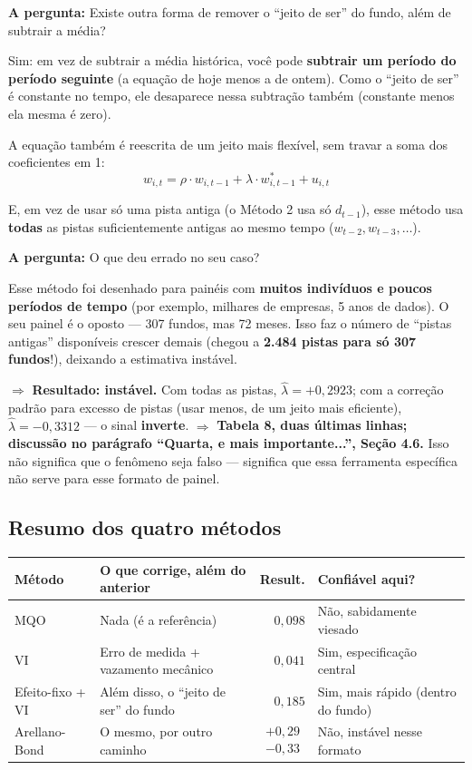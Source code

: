 \documentclass[11pt,a4paper]{article}
\newcommand{\pergunta}[1]{\par\vspace{4pt}\noindent\textbf{\color{azul}A pergunta:} #1\par\vspace{2pt}}
\begin{document}
\pergunta{Existe outra forma de remover o ``jeito de ser'' do fundo, além de subtrair a média?}

Sim: em vez de subtrair a média histórica, você pode \textbf{subtrair um período do período
seguinte} (a equação de hoje menos a de ontem). Como o ``jeito de ser'' é constante no tempo, ele
desaparece nessa subtração também (constante menos ela mesma é zero).

A equação também é reescrita de um jeito mais flexível, sem travar a soma dos coeficientes em 1:
$$w_{i,t} = \rho \cdot w_{i,t-1} + \lambda \cdot w^*_{i,t-1} + u_{i,t}$$

E, em vez de usar só uma pista antiga (o Método 2 usa só $d_{t-1}$), esse método usa \textbf{todas}
as pistas suficientemente antigas ao mesmo tempo ($w_{t-2}, w_{t-3}, \dots$).

\pergunta{O que deu errado no seu caso?}

Esse método foi desenhado para painéis com \textbf{muitos indivíduos e poucos períodos de
tempo} (por exemplo, milhares de empresas, 5 anos de dados). O seu painel é o oposto --- 307
fundos, mas 72 meses. Isso faz o número de ``pistas antigas'' disponíveis crescer demais (chegou
a \textbf{2.484 pistas para só 307 fundos}!), deixando a estimativa instável.

$\Rightarrow$ \textbf{Resultado: instável.} Com todas as pistas, $\widehat\lambda=+0{,}2923$; com a correção
padrão para excesso de pistas (usar menos, de um jeito mais eficiente), $\widehat\lambda=-0{,}3312$
--- o sinal \textbf{inverte}. $\Rightarrow$ \textbf{Tabela 8, duas últimas linhas; discussão no parágrafo
``Quarta, e mais importante...'', Seção 4.6.} Isso não significa que o fenômeno seja falso ---
significa que essa ferramenta específica não serve para esse formato de painel.

\subsection{Resumo dos quatro métodos}

\begin{center}\footnotesize
\begin{tabular}{@{}lp{5.0cm}rp{3.0cm}@{}}
\toprule
Método & O que corrige, além do anterior & Result. & Confiável aqui? \\
\midrule
MQO & Nada (é a referência) & $0{,}098$ & Não, sabidamente viesado \\
VI & Erro de medida + vazamento mecânico & $0{,}041$ & Sim, especificação central \\
Efeito-fixo + VI & Além disso, o ``jeito de ser'' do fundo & $0{,}185$ & Sim, mais rápido (dentro do fundo) \\
Arellano-Bond & O mesmo, por outro caminho & $\begin{matrix}+0{,}29\\-0{,}33\end{matrix}$ & Não, instável nesse formato \\
\bottomrule
\end{tabular}
\end{center}
\end{document}
